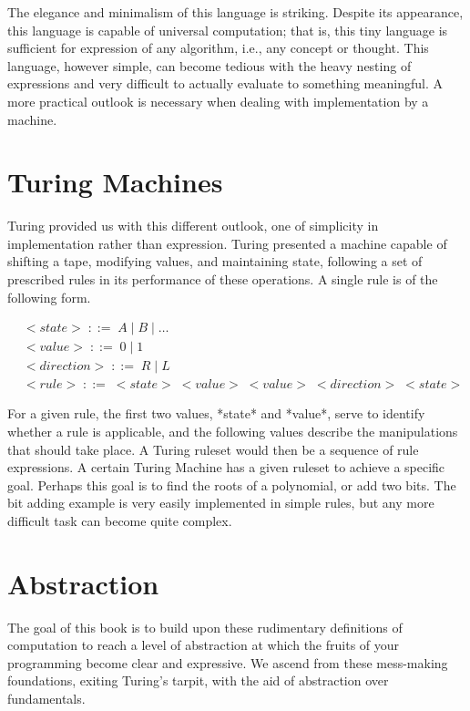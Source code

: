 The elegance and minimalism of this language is striking. Despite its appearance, 
this language is capable of universal computation; that is, this tiny language is 
sufficient for expression of any algorithm, i.e., any concept or thought. This 
language, however simple, can become tedious with the heavy nesting of expressions 
and very difficult to actually evaluate to something meaningful. A more practical 
outlook is necessary when dealing with implementation by a machine.

\section{Turing Machines}
Turing provided us with this different outlook, one of simplicity in 
implementation rather than expression. Turing presented a machine capable of 
shifting a tape, modifying values, and maintaining state, following a set of 
prescribed rules in its performance of these operations. A single rule is of the 
following form.

\begin{align*}
& <state> \; ::= \; A \; | \; B \; | \; \dots
\\& <value> \; ::= \; 0 \; | \; 1
\\& <direction> \; ::= \; R \; | \; L
\\& <rule> \; ::= \; <state> \; <value> \; <value> \; <direction> \; <state>
\end{align*}

For a given rule, the first two values, *state* and *value*, serve to identify 
whether a rule is applicable, and the following values describe the manipulations 
that should take place. A Turing ruleset would then be a sequence of rule 
expressions. A certain Turing Machine has a given ruleset to achieve a specific 
goal. Perhaps this goal is to find the roots of a polynomial, or add two bits. The 
bit adding example is very easily implemented in simple rules, but any more 
difficult task can become quite complex.

\section{Abstraction}
The goal of this book is to build upon these rudimentary definitions of 
computation to reach a level of abstraction at which the fruits of your 
programming become clear and expressive. We ascend from these mess-making 
foundations, exiting Turing's tarpit, with the aid of abstraction over 
fundamentals.

